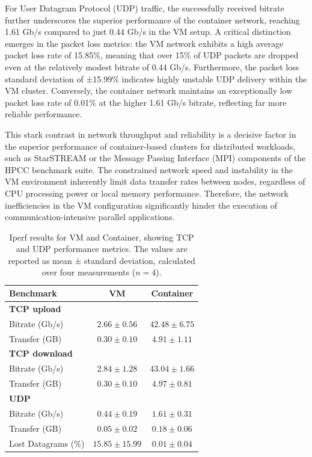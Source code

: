 For User Datagram Protocol (UDP) traffic, the successfully received bitrate further underscores the superior performance of the container network, reaching 1.61 Gb/s compared to just 0.44 Gb/s in the VM setup. A critical distinction emerges in the packet loss metrics: the VM network exhibits a high average packet loss rate of 15.85\%, meaning that over 15\% of UDP packets are dropped even at the relatively modest bitrate of 0.44 Gb/s. Furthermore, the packet loss standard deviation of ±15.99\% indicates highly unstable UDP delivery within the VM cluster. Conversely, the container network maintains an exceptionally low packet loss rate of 0.01\% at the higher 1.61 Gb/s bitrate, reflecting far more reliable performance.

This stark contrast in network throughput and reliability is a decisive factor in the superior performance of container-based clusters for distributed workloads, such as StarSTREAM or the Message Passing Interface (MPI) components of the HPCC benchmark suite. The constrained network speed and instability in the VM environment inherently limit data transfer rates between nodes, regardless of CPU processing power or local memory performance. Therefore, the network inefficiencies in the VM configuration significantly hinder the execution of communication-intensive parallel applications.
\begin{table}[htbp]
    \centering
    \begin{tabular}{lcc}
    \toprule
    \textbf{Benchmark} & \textbf{VM} & \textbf{Container} \\
    \midrule
    \textbf{TCP upload} & & \\
    Bitrate (Gb/s) & $2.66 \pm 0.56$ & $42.48 \pm 6.75$ \\
    Transfer (GB) & $0.30 \pm 0.10$ & $4.91 \pm 1.11$ \\
    \midrule
    \textbf{TCP download} & & \\
    Bitrate (Gb/s) & $2.84 \pm 1.28$ & $43.04 \pm 1.66$ \\
    Transfer (GB) & $0.30 \pm 0.10$ & $4.97 \pm 0.81$ \\
    \midrule
    \textbf{UDP} & & \\
    Bitrate (Gb/s) & $0.44 \pm 0.19$ & $1.61 \pm 0.31$ \\
    Transfer (GB) & $0.05 \pm 0.02$ & $0.18 \pm 0.06$ \\
    Lost Datagrams (\%) & $15.85 \pm 15.99$ & $0.01 \pm 0.04$ \\
    \bottomrule
    \end{tabular}
    \caption{Iperf results for VM and Container, showing TCP and UDP performance metrics. The values are reported as mean ± standard deviation, calculated over four measurements ($n = 4$).}
    \label{tab:iperf}
\end{table}